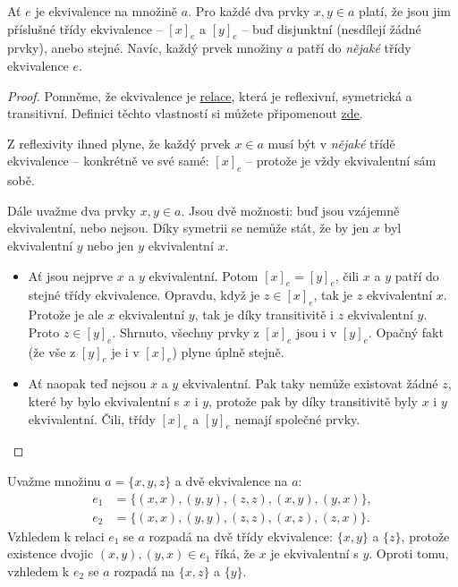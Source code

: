 \begin{lemma}
  \label{lem:o-tridach-ekvivalence}
  Ať $e$ je ekvivalence na množině $a$. Pro každé dva prvky $x, y \in a$ platí,
  že jsou jim příslušné třídy ekvivalence -- $[x]_e$ a $[y]_e$ -- buď disjunktní
  (nesdílejí žádné prvky), anebo stejné. Navíc, každý prvek množiny $a$ patří do
  \emph{nějaké} třídy ekvivalence $e$.
\end{lemma}
\begin{proof}
  Pomněme, že ekvivalence je \hyperref[def:relace]{relace}, která je
  \alert{reflexivní}, \alert{symetrická} a \alert{transitivní}. Definici těchto
  vlastností si můžete připomenout
  \hyperref[def:vlastnosti-relaci-na-mnozine]{zde}.

  Z \alert{reflexivity} ihned plyne, že každý prvek $x \in a$ musí být v
  \emph{nějaké} třídě ekvivalence -- konkrétně ve své samé: $[x]_e$ -- protože
  je vždy ekvivalentní sám sobě.

  Dále uvažme dva prvky $x, y \in a$. Jsou dvě možnosti: buď jsou vzájemně
  ekvivalentní, nebo nejsou. Díky \alert{symetrii} se nemůže stát, že by jen $x$
  byl ekvivalentní $y$ nebo jen $y$ ekvivalentní $x$.
  \begin{itemize}
    \item Ať jsou nejprve $x$ a $y$ ekvivalentní. Potom $[x]_e = [y]_e$, čili
      $x$ a $y$ patří do stejné třídy ekvivalence. Opravdu, když je $z \in
      [x]_e$, tak je $z$ ekvivalentní $x$. Protože je ale $x$ ekvivalentní $y$,
      tak je díky \alert{transitivitě} i $z$ ekvivalentní $y$. Proto $z \in
      [y]_e$. Shrnuto, všechny prvky z $[x]_e$ jsou i v $[y]_e$. Opačný fakt (že
      vše z $[y]_e$ je i v $[x]_e$) plyne úplně stejně.
    \item Ať naopak teď nejsou $x$ a $y$ ekvivalentní. Pak taky nemůže existovat
      žádné $z$, které by bylo ekvivalentní s $x$ i $y$, protože pak by díky
      \alert{transitivitě} byly $x$ i $y$ ekvivalentní. Čili, třídy $[x]_e$ a
      $[y]_e$ nemají společné prvky.\qedhere
  \end{itemize}
\end{proof}

\begin{example}
  \label{exam:trida-ekvivalence-2}
  Uvažme množinu $a = \{x, y, z\}$ a dvě ekvivalence na $a$:
  \begin{align*}
    e_1 &= \{(x, x), (y, y), (z, z), (x, y), (y, x)\},\\
    e_2 &= \{(x, x), (y, y), (z, z), (x, z), (z, x)\}.
  \end{align*}
  Vzhledem k relaci $e_1$ se $a$ rozpadá na dvě třídy ekvivalence: $\{x, y\}$ a
  $\{z\}$, protože existence dvojic $(x, y), (y, x) \in e_1$ říká, že $x$ je
  ekvivalentní s $y$. Oproti tomu, vzhledem k $e_2$ se $a$ rozpadá na $\{x, z\}$
  a $\{y\}$.
\end{example}


